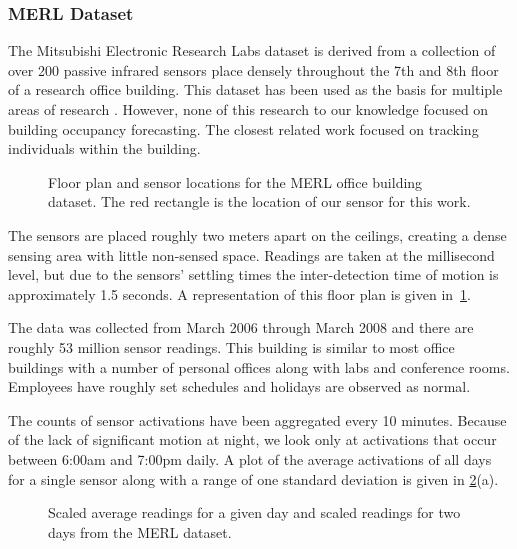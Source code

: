 \subsubsection{MERL Dataset} 
The Mitsubishi Electronic Research Labs dataset is derived from a collection of over 200 passive infrared sensors place densely throughout the 7th and 8th floor of a research office building.  This dataset has been used as the basis for multiple areas of research \cite{Wren2003, Wren2006, Wren2007a, Dong2011, Minnen2004, Wren2006a, Wren2007}.  However, none of this research to our knowledge focused on building occupancy forecasting.  The closest related work focused on tracking individuals within the building.

\begin{figure}[!ht]
	\begin{center}
	\end{center}
	\caption{Floor plan and sensor locations for the MERL office building dataset.  The red rectangle is the location of our sensor for this work.}
	\label{fig:merlfloor}
\end{figure}

The sensors are placed roughly two meters apart on the ceilings, creating a dense sensing area with little non-sensed space.  Readings are taken at the millisecond level, but due to the sensors' settling times the inter-detection time of motion is approximately 1.5 seconds.  A representation of this floor plan is given in~\ref{fig:merlfloor}.

The data was collected from March 2006 through March 2008 and there are roughly 53 million sensor readings.  This building is similar to most office buildings with a number of personal offices along with labs and conference rooms.  Employees have roughly set schedules and holidays are observed as normal. 

The counts of sensor activations have been aggregated every 10 minutes.  Because of the lack of significant motion at night, we look only at activations that occur between 6:00am and 7:00pm daily.  A plot of the average activations of all days for a single sensor along with a range of one standard deviation is given in \ref{fig:merl_scaled}(a).

\begin{figure}[!ht]
	\begin{center}
	\end{center}
	\caption{Scaled average readings for a given day and scaled readings for two days from the MERL dataset.}
	\label{fig:merl_scaled}
\end{figure}

